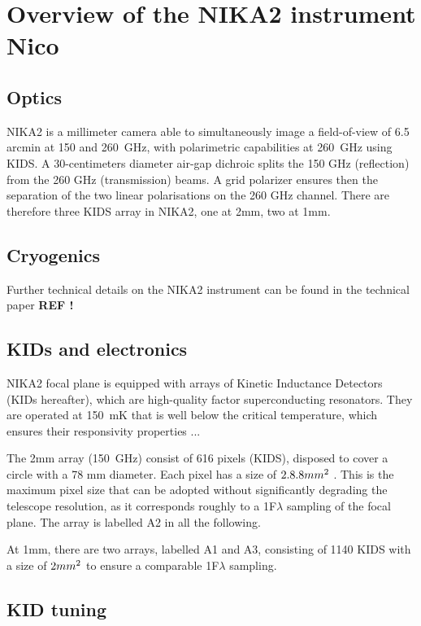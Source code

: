 
\section{Overview of the NIKA2 instrument {\color{blue} Nico} }

\subsection{Optics}

NIKA2 is a millimeter camera able to simultaneously image a
field-of-view of 6.5\,arcmin at 150 and 260~GHz, with polarimetric
capabilities at 260~GHz using KIDS. A 30-centimeters diameter air-gap
dichroic splits the 150 GHz (reflection) from the 260 GHz
(transmission) beams.  A grid polarizer ensures then the separation of
the two linear polarisations on the 260 GHz channel.  There are
therefore three KIDS array in NIKA2, one at 2mm, two at 1mm. 




\subsection{Cryogenics}
Further technical details on the NIKA2 instrument can be found in the
technical paper {\bf REF !}



\subsection{KIDs and electronics}

NIKA2 focal plane is equipped with arrays of Kinetic Inductance
Detectors (KIDs hereafter), which are high-quality factor
superconducting resonators. They are operated at 150~mK that is well
below the critical temperature, which ensures their responsivity
properties ... 


The 2mm array (150~GHz) consist of 616 pixels
(KIDS), disposed to cover a circle with a 78 mm diameter. Each pixel
has a size of $2.8 \time 2.8 mm^{2}$ . This is the maximum pixel size that can
be adopted without significantly degrading the telescope resolution,
as it corresponds roughly to a 1F$\lambda$ sampling of the focal
plane.  The array is labelled A2 in all the following.

At 1mm, there are two arrays, labelled A1 and A3, consisting of 1140
KIDS with a size of $2 \time 2 mm^{2}$ to ensure a comparable 1F$\lambda$
sampling.




\subsection{KID tuning}





